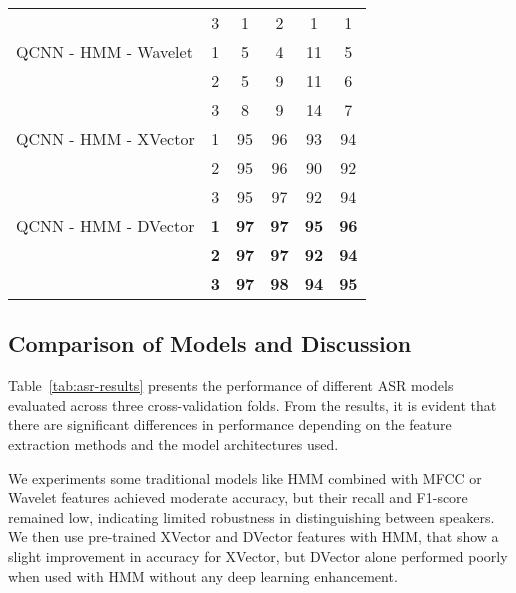 \documentclass[conference]{IEEEtran}
\begin{document}
\begin{table*}[htbp]
\begin{tabular}{|l|c|c|c|c|c|}
                             & 3             & 1                      & 2                       & 1                    & 1                      \\
        QCNN - HMM - Wavelet & 1             & 5                      & 4                       & 11                   & 5                      \\
                             & 2             & 5                      & 9                       & 11                   & 6                      \\
                             & 3             & 8                      & 9                       & 14                   & 7                      \\
        QCNN - HMM - XVector & 1             & 95                     & 96                      & 93                   & 94                     \\
                             & 2             & 95                     & 96                      & 90                   & 92                     \\
                             & 3             & 95                     & 97                      & 92                   & 94                     \\
        \rowcolor{gray!20} QCNN - HMM - DVector & \textbf{1} & \textbf{97} & \textbf{97} & \textbf{95} & \textbf{96} \\
        \rowcolor{gray!20}                      & \textbf{2} & \textbf{97} & \textbf{97} & \textbf{92} & \textbf{94} \\
        \rowcolor{gray!20}                      & \textbf{3} & \textbf{97} & \textbf{98} & \textbf{94} & \textbf{95} \\
        \hline
    \end{tabular}
\end{table*}
\subsection{Comparison of Models and Discussion}

Table~\ref{tab:asr-results} presents the performance of different ASR models evaluated across three cross-validation folds. From the results, it is evident that there are significant differences in performance depending on the feature extraction methods and the model architectures used.

We experiments some traditional models like HMM combined with MFCC or Wavelet features achieved moderate accuracy, but their recall and F1-score remained low, indicating limited robustness in distinguishing between speakers. We then use pre-trained XVector and DVector features with HMM, that show a slight improvement in accuracy for XVector, but DVector alone performed poorly when used with HMM without any deep learning enhancement.
\end{document}
